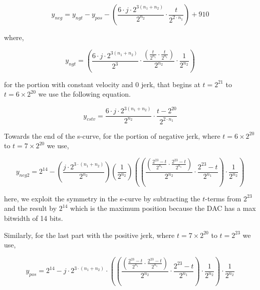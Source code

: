 \documentclass[12pt, twoside]{report}
\begin{document}
\begin{equation}
y_{neg}=y_{n g t}-y_{p o s}-\left(\frac{6 \cdot j \cdot 2^{3\left(n_1+n_2\right)}}{2^{n_2}} \cdot \frac{t}{2^{2 \cdot n_1}}\right)+910
\label{eq:3}
\end{equation}

where, 

\begin{equation}
y_{ngt}=\left(\frac{6 \cdot j \cdot 2^{3\left(n_1+n_2\right)}}{2^3} \cdot \frac{\left(\frac{t}{2^{n_1}} \cdot \frac{t}{2^{n_1}}\right)}{2^{n_2}}\cdot \frac{1}{2^{n_2}}\right)
\label{eq:2}
\end{equation}

\vspace{0.5em}
for the portion with constant velocity and 0 jerk, that begins at $t = 2^{21}$ to $t = 6 \times 2^{20}$ we use the following equation.

\begin{equation}
y_{c s t v}=\frac{6 \cdot j \cdot 2^{3\left(n_1+n_2\right)}}{2^{n_2}} \cdot \frac{t -2^{20}}{2^{2 \cdot n_1}}
\label{eq:5}
\end{equation}

\vspace{1em}
Towards the end of the s-curve, for the portion of negative jerk, where $t= 6 \times 2^{20}$ to $t = 7 \times 2^{20}$ we use,

\begin{equation}
y_{n e g 2} = 2^{14} - \left( \frac{j \cdot 2^{3 \cdot\left(n_1+n_2\right)}}{2^{n_2}} \right) \left( \frac{1}{2^{n_2}} \right) \left( \left(\frac{\left(\frac{2^{23}-t}{2^{n_1}} \cdot \frac{2^{23}-t}{2^{n_1}}\right)}{2^{n_2}} \cdot \frac{2^{23}-t}{2^{n_1}}\right) \cdot \frac{1}{2^{n_2}} \right)
\label{eq:6}
\end{equation}

\vspace{0.5em}
here, we exploit the symmetry in the s-curve by subtracting the $t$-terms from $2^{23}$ and the result by $2^{14}$ which is the maximum position because the DAC has a max bitwidth of 14 bits. 

\vspace{1em}
Similarly, for the last part with the positive jerk, where $ t = 7 \times 2^{20}$ to $t = 2^{23}$ we use, 

\begin{equation}
y_{p o s}= 2^{14} - j \cdot 2^{3 \cdot\left(n_1+n_2\right)} \cdot\left(\left(\frac{\left(\frac{2^{23}-t}{2^{n_1}} \cdot \frac{2^{23}-t}{2^{n_1}}\right)}{2^{n_2}} \cdot \frac{2^{23}-t}{2^{n_1}}\right) \cdot \frac{1}{2^{n_2}} \right) \cdot \frac{1}{2^{n_2}}
\label{eq:pos-j1-s}
\end{equation}
\end{document}
